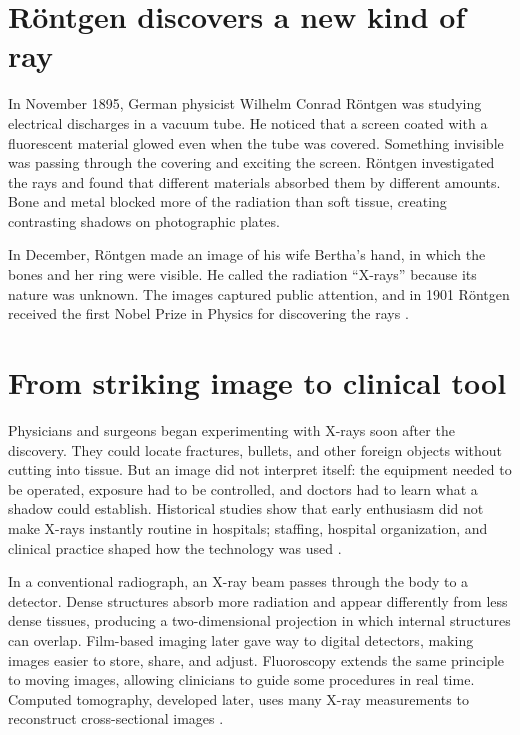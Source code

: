 \documentclass[12pt,oneside]{book}
\begin{document}
\section{R\"ontgen discovers a new kind of ray}
In November 1895, German physicist Wilhelm Conrad R\"ontgen was studying
electrical discharges in a vacuum tube. He noticed that a screen coated with
a fluorescent material glowed even when the tube was covered. Something
invisible was passing through the covering and exciting the screen. R\"ontgen
investigated the rays and found that different materials absorbed them by
different amounts. Bone and metal blocked more of the radiation than soft
tissue, creating contrasting shadows on photographic plates.

In December, R\"ontgen made an image of his wife Bertha's hand, in which the
bones and her ring were visible. He called the radiation ``X-rays'' because
its nature was unknown. The images captured public attention, and in 1901
R\"ontgen received the first Nobel Prize in Physics for discovering the
rays \cite{nobelRoentgen,wurzburgRoentgen}.

\section{From striking image to clinical tool}
Physicians and surgeons began experimenting with X-rays soon after the
discovery. They could locate fractures, bullets, and other foreign objects
without cutting into tissue. But an image did not interpret itself: the
equipment needed to be operated, exposure had to be controlled, and doctors
had to learn what a shadow could establish. Historical studies show that
early enthusiasm did not make X-rays instantly routine in hospitals; staffing,
hospital organization, and clinical practice shaped how the technology was
used \cite{howellXray}.

In a conventional radiograph, an X-ray beam passes through the body to a
detector. Dense structures absorb more radiation and appear differently from
less dense tissues, producing a two-dimensional projection in which internal
structures can overlap. Film-based imaging later gave way to digital
detectors, making images easier to store, share, and adjust. Fluoroscopy
extends the same principle to moving images, allowing clinicians to guide
some procedures in real time. Computed tomography, developed later, uses
many X-ray measurements to reconstruct cross-sectional images
\cite{fdaMedicalXray}.
\end{document}
